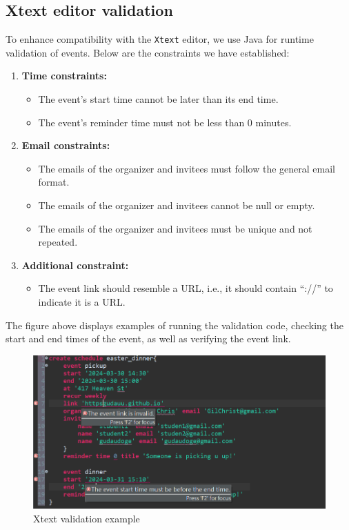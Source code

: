 \documentclass[12pt, letterpaper, twoside]{article}
\begin{document}
\subsection{Xtext editor validation}
To enhance compatibility with the \texttt{Xtext} editor, we use Java for runtime validation of events. Below are the constraints we have established:
\begin{enumerate}
    \item \textbf{Time constraints:}
    \begin{itemize}
        \item The event's start time cannot be later than its end time.
        \item The event's reminder time must not be less than 0 minutes.
    \end{itemize}

    \item \textbf{Email constraints:}
    \begin{itemize}
        \item The emails of the organizer and invitees must follow the general email format.
        \item The emails of the organizer and invitees cannot be null or empty.
        \item The emails of the organizer and invitees must be unique and not repeated.
    \end{itemize}

    \item \textbf{Additional constraint:}
    \begin{itemize}
        \item The event link should resemble a URL, i.e., it should contain ``://'' to indicate it is a URL.
    \end{itemize}
\end{enumerate}

The figure above displays examples of running the validation code, checking the start and end times of the event, as well as verifying the event link.
\begin{figure}
    \centering
    \includegraphics[width=1\linewidth]{xtext validation.png}
    \caption{Xtext validation example}
    \label{fig:enter-label}
\end{figure}
\newpage
\end{document}
